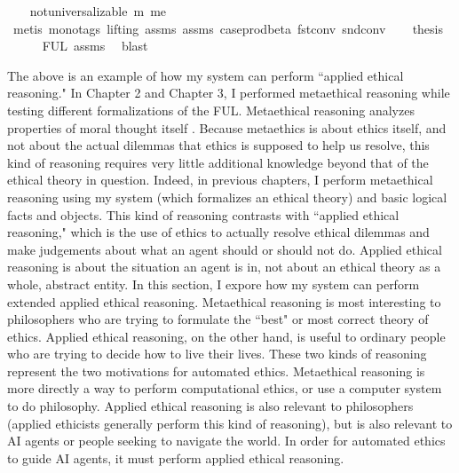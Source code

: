 \begin{isabellebody}
{}\isanewline
\ \ \isamarkupfalse%
\ {\isachardoublequoteopen}not{\isacharunderscore}universalizable\ m\ me{\isachardoublequoteclose}\isanewline
\ \ \ \ \isamarkupfalse%
\ {\isacharparenleft}metis\ {\isacharparenleft}mono{\isacharunderscore}tags{\isacharcomma}\ lifting{\isacharparenright}\ assms{\isacharparenleft}{}{\isacharparenright}\ assms{\isacharparenleft}{}{\isacharparenright}\ case{\isacharunderscore}prod{\isacharunderscore}beta\ fst{\isacharunderscore}conv\ snd{\isacharunderscore}conv{\isacharparenright}\isanewline
\ \ \isamarkupfalse%
\ {\isacharquery}thesis\isanewline
\ \ \ \ \isamarkupfalse%
\ FUL\ assms{\isacharparenleft}{}{\isacharparenright}\ \isamarkupfalse%
\ blast\ \isanewline
{}\isamarkupfalse%
%
\endisatagproof
{\isafoldproof}%
%
\isadelimproof
%
\endisadelimproof
%
\begin{isamarkuptext}%
The above is an example of how my system can perform ``applied ethical reasoning." In Chapter 2
and Chapter 3, I performed metaethical reasoning while testing different formalizations of the FUL. Metaethical
reasoning analyzes properties of moral thought itself \citep{sepme}. Because metaethics is about ethics itself,
and not about the actual dilemmas that ethics is supposed to help us resolve, this kind of reasoning requires
very little additional knowledge beyond that of the ethical theory in question. Indeed, in previous chapters,
I perform metaethical reasoning using my system (which formalizes an ethical theory) and basic logical
facts and objects. This kind of reasoning contrasts with ``applied ethical reasoning," which is the use of
ethics to actually resolve ethical dilemmas and make judgements about what an agent should or should not do.
Applied ethical reasoning is about the situation an agent is in, not about an ethical theory as a whole,
abstract entity. In this section, I expore how my system can perform extended applied ethical reasoning. 
Metaethical reasoning is most interesting to philosophers who are trying to formulate the ``best" or 
most correct theory of ethics. Applied ethical reasoning, on the other hand, is useful to ordinary people
who are trying to decide how to live their lives. These two kinds of reasoning represent the two motivations 
for automated ethics. Metaethical reasoning is more directly a way to perform computational ethics, or use a computer
system to do philosophy. Applied ethical reasoning is also relevant to philosophers (applied ethicists 
generally perform this kind of reasoning), but is also relevant to AI agents or people seeking to navigate the world.
In order for automated ethics to guide AI agents, it must perform applied ethical reasoning. 


\end{isamarkuptext}
\end{isabellebody}
